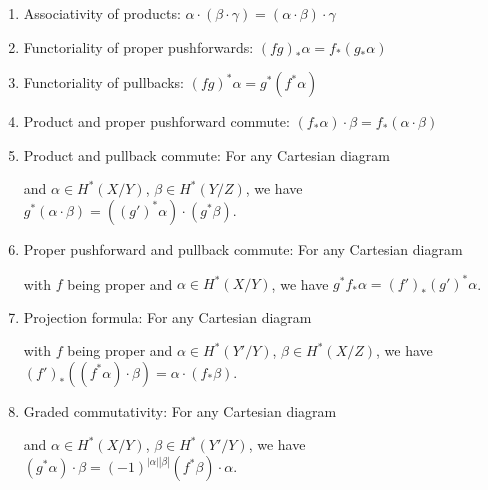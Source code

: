 \documentclass[10pt]{amsart}
\newcommand{\+}{{}^+}
\theoremstyle{definition}
\theoremstyle {definition}
\theoremstyle {definition}
\begin{document}
\begin{enumerate}
    \item [(A1)] Associativity of products: $\alpha\cdot(\beta\cdot\gamma)=(\alpha\cdot\beta)\cdot\gamma$
    \item [(A2)] Functoriality of proper pushforwards: $(fg)_*\alpha=f_*(g_*\alpha)$
    \item [(A3)] Functoriality of pullbacks: $(fg)^*\alpha=g^*(f^*\alpha)$
    \item [(A4)] Product and proper pushforward commute: $(f_*\alpha)\cdot \beta=f_*(\alpha\cdot \beta)$
    \item [(A5)] Product and pullback commute: For any Cartesian diagram
    \begin{center}
    \end{center}
    and $\alpha\in H^*(X/Y)$, $\beta\in H^*(Y/Z)$, we have $g^*(\alpha\cdot\beta)=((g')^*\alpha)\cdot (g^*\beta)$. 
    \item [(A6)] Proper pushforward and pullback commute: For any Cartesian diagram
    \begin{center}
    \end{center}
    with $f$ being proper and $\alpha\in H^*(X/Y)$, we have $g^*f_*\alpha=(f')_*(g')^*\alpha$.
    \item [(A7)] Projection formula: For any Cartesian diagram
    \begin{center}
    \end{center}
    with $f$ being proper and $\alpha\in H^*(Y'/Y)$, $\beta\in H^*(X/Z)$, we have $(f')_*((f^*\alpha)\cdot \beta)=\alpha\cdot (f_*\beta).$
    \item [(A8)] Graded commutativity: For any Cartesian diagram
    \begin{center}
    \end{center}
    and $\alpha\in H^*(X/Y)$, $\beta\in H^*(Y'/Y)$, we have $(g^*\alpha)\cdot \beta = (-1)^{|\alpha||\beta|} (f^*\beta)\cdot \alpha$. 
\end{enumerate}
\end{document}
